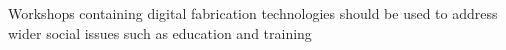 Workshops containing digital fabrication technologies should be used to address wider social issues such as education and training